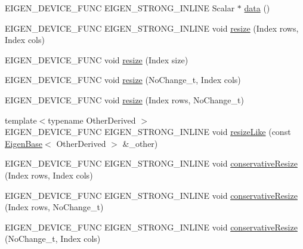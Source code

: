 \begin{DoxyCompactItemize}
\item 
E\+I\+G\+E\+N\+\_\+\+D\+E\+V\+I\+C\+E\+\_\+\+F\+U\+NC E\+I\+G\+E\+N\+\_\+\+S\+T\+R\+O\+N\+G\+\_\+\+I\+N\+L\+I\+NE Scalar $\ast$ \mbox{\hyperlink{class_eigen_1_1_plain_object_base_a54ed64f45b2f5e852355d5e2311810bd}{data}} ()
\item 
E\+I\+G\+E\+N\+\_\+\+D\+E\+V\+I\+C\+E\+\_\+\+F\+U\+NC E\+I\+G\+E\+N\+\_\+\+S\+T\+R\+O\+N\+G\+\_\+\+I\+N\+L\+I\+NE void \mbox{\hyperlink{class_eigen_1_1_plain_object_base_a99d9054ee2d5a40c6e00ded0265e9cea}{resize}} (Index rows, Index cols)
\item 
E\+I\+G\+E\+N\+\_\+\+D\+E\+V\+I\+C\+E\+\_\+\+F\+U\+NC void \mbox{\hyperlink{class_eigen_1_1_plain_object_base_abf8a9ec07cd52a2cdabb527596f7ddd1}{resize}} (Index size)
\item 
E\+I\+G\+E\+N\+\_\+\+D\+E\+V\+I\+C\+E\+\_\+\+F\+U\+NC void \mbox{\hyperlink{class_eigen_1_1_plain_object_base_ab71a655f73d05a0e389e3ed13b6fe5f3}{resize}} (No\+Change\+\_\+t, Index cols)
\item 
E\+I\+G\+E\+N\+\_\+\+D\+E\+V\+I\+C\+E\+\_\+\+F\+U\+NC void \mbox{\hyperlink{class_eigen_1_1_plain_object_base_a7b44761b7350ae3756035bbf7d7c04f6}{resize}} (Index rows, No\+Change\+\_\+t)
\item 
{\footnotesize template$<$typename Other\+Derived $>$ }\\E\+I\+G\+E\+N\+\_\+\+D\+E\+V\+I\+C\+E\+\_\+\+F\+U\+NC E\+I\+G\+E\+N\+\_\+\+S\+T\+R\+O\+N\+G\+\_\+\+I\+N\+L\+I\+NE void \mbox{\hyperlink{class_eigen_1_1_plain_object_base_acc7200947e6399bee847ff37c8270fc8}{resize\+Like}} (const \mbox{\hyperlink{struct_eigen_1_1_eigen_base}{Eigen\+Base}}$<$ Other\+Derived $>$ \&\+\_\+other)
\item 
E\+I\+G\+E\+N\+\_\+\+D\+E\+V\+I\+C\+E\+\_\+\+F\+U\+NC E\+I\+G\+E\+N\+\_\+\+S\+T\+R\+O\+N\+G\+\_\+\+I\+N\+L\+I\+NE void \mbox{\hyperlink{class_eigen_1_1_plain_object_base_a5e06c62950ba98fe8ba9c7d4be9c19e4}{conservative\+Resize}} (Index rows, Index cols)
\item 
E\+I\+G\+E\+N\+\_\+\+D\+E\+V\+I\+C\+E\+\_\+\+F\+U\+NC E\+I\+G\+E\+N\+\_\+\+S\+T\+R\+O\+N\+G\+\_\+\+I\+N\+L\+I\+NE void \mbox{\hyperlink{class_eigen_1_1_plain_object_base_a528879aef40f9cbc4ab4925e4a6bceb9}{conservative\+Resize}} (Index rows, No\+Change\+\_\+t)
\item 
E\+I\+G\+E\+N\+\_\+\+D\+E\+V\+I\+C\+E\+\_\+\+F\+U\+NC E\+I\+G\+E\+N\+\_\+\+S\+T\+R\+O\+N\+G\+\_\+\+I\+N\+L\+I\+NE void \mbox{\hyperlink{class_eigen_1_1_plain_object_base_a46afa73816539b0fe36c6e9abd7978a6}{conservative\+Resize}} (No\+Change\+\_\+t, Index cols)

\end{DoxyCompactItemize}

